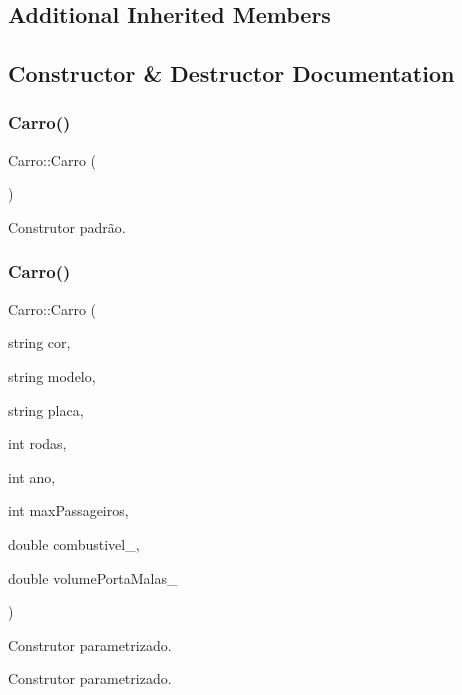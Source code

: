 \subsection*{Additional Inherited Members}


\subsection{Constructor \& Destructor Documentation}
\mbox{\label{classCarro_aa2f4235be16e1f66e4b8dfb939b403ec}} 
\subsubsection{\texorpdfstring{Carro()}{Carro()}\hspace{0.1cm}{\footnotesize\ttfamily [1/2]}}
{\footnotesize\ttfamily Carro\+::\+Carro (\begin{DoxyParamCaption}{ }\end{DoxyParamCaption})}

Construtor padrão. \mbox{\label{classCarro_aaf29ee243f81f502edf2fd7d6111d305}} 
\subsubsection{\texorpdfstring{Carro()}{Carro()}\hspace{0.1cm}{\footnotesize\ttfamily [2/2]}}
{\footnotesize\ttfamily Carro\+::\+Carro (\begin{DoxyParamCaption}\item[{string}]{cor,  }\item[{string}]{modelo,  }\item[{string}]{placa,  }\item[{int}]{rodas,  }\item[{int}]{ano,  }\item[{int}]{max\+Passageiros,  }\item[{double}]{combustivel\+\_\+,  }\item[{double}]{volume\+Porta\+Malas\+\_\+ }\end{DoxyParamCaption})}



Construtor parametrizado. 

Construtor parametrizado.


